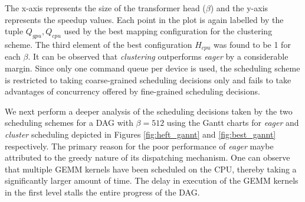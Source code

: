 	The x-axis represents the size of the transformer head ($\beta$) and the y-axis represents the speedup values. Each point in the plot is again labelled by the tuple $Q_{gpu},Q_{cpu}$ used by the best mapping configuration for the clustering scheme. The third element of the best configuration $H_{cpu}$ was found to be 1 for each $\beta$. It can be observed that {\em clustering} outperforms {\em eager} by a considerable margin. Since only one command queue per device is used, the scheduling scheme is restricted to taking coarse-grained scheduling decisions only and fails to take advantages of concurrency offered by fine-grained scheduling decisions. 
	\par We next perform a deeper analysis of the scheduling decisions taken by the two scheduling schemes for a DAG with $\beta=512$ using the Gantt charts for {\em eager} and {\em cluster} scheduling depicted in
	Figures \ref{fig:heft_gannt} and \ref{fig:best_gannt} respectively. The primary reason for the poor performance of  {\em eager} maybe attributed to the
	greedy nature of its dispatching mechanism. One can observe that multiple GEMM kernels have been scheduled on the CPU, thereby taking a significantly larger amount of time. The delay in  execution of the GEMM kernels in the first level stalls the entire progress of the DAG. 

